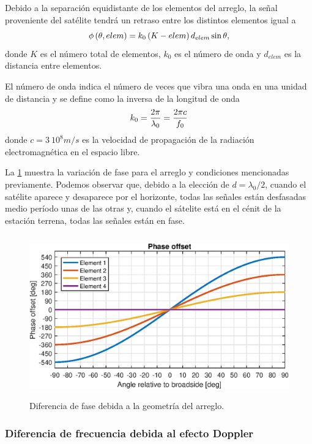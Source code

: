 \documentclass{article}
\newenvironment{standalone}{\begin{preview}}{\end{preview}}
\begin{document}
\begin{standalone}
  Debido a la separación equidistante de los elementos del arreglo, la señal proveniente del satélite tendrá un retraso entre los distintos elementos igual a \cite[126]{visser2005}
  \begin{equation}
    \phi \left( \theta, elem \right) = k_0 \left( K - elem \right) d_{elem} \sin{\theta},
    \tagaddtext{[\si{\radian}]}
  \end{equation}
  donde $K$ es el número total de elementos, $k_0$ es el número de onda y $d_{elem}$ es la distancia entre elementos.

  El número de onda indica el número de veces que vibra una onda en una unidad de distancia y se define como la inversa de la longitud de onda
  \begin{equation}
    k_0 = \frac{2\pi}{\lambda_{0}} = \frac{2\pi c}{f_0}
    \tagaddtext{[\si{\radian\per\meter}]}
  \end{equation}
  donde $c = 3 \ 10^8 m/s$ es la velocidad de propagación de la radiación electromagnética en el espacio libre.

  La \cref{fig:phase-offset} muestra la variación de fase para el arreglo y condiciones mencionadas previamente. Podemos observar que, debido a la elección de $d = \lambda_0 / 2$, cuando el satélite aparece y desaparece por el horizonte, todas las señales están desfasadas medio período unas de las otras y, cuando el sátelite está en el cénit de la estación terrena, todas las señales están en fase.

  \begin{figure}[!htbp]
    \centering
    \includegraphics[width=\linewidth, height=70mm, keepaspectratio]{../images/phase-offset.eps}
    \caption{Diferencia de fase debida a la geometría del arreglo.}
    \label{fig:phase-offset}
  \end{figure}

  \subsubsection{Diferencia de frecuencia debida al efecto Doppler}


\end{standalone}
\end{document}
